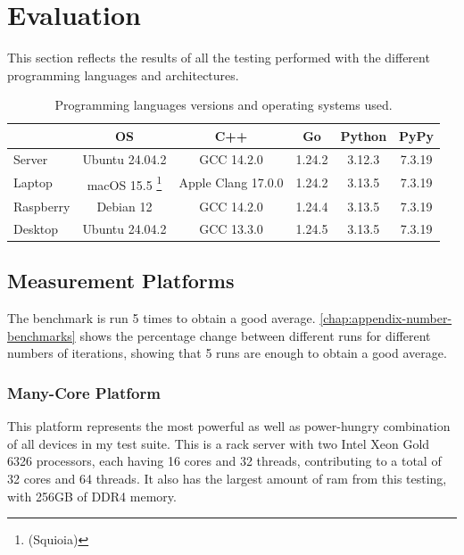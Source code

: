 \chapter{Evaluation}\label{chap:evaluation}

This section reflects the results of all the testing performed with the different programming languages and architectures.

\begin{table}[ht]
  \centering
  \begin{tabular}{lccccc}
    \toprule
               & \gls{OS}                         & C++                  & Go       & Python & PyPy \\
    \midrule
    Server     & Ubuntu 24.04.2                   &  GCC 14.2.0          & 1.24.2  & 3.12.3 & 7.3.19 \\
    Laptop     & macOS 15.5 \footnote{(Squioia)}  &  Apple Clang 17.0.0  & 1.24.2  & 3.13.5 & 7.3.19 \\
    Raspberry  & Debian 12                        &  GCC 14.2.0          & 1.24.4  & 3.13.5 & 7.3.19 \\
    Desktop    & Ubuntu 24.04.2                   &  GCC 13.3.0          & 1.24.5  & 3.13.5 & 7.3.19 \\
    \bottomrule
  \end{tabular}
  \caption[Language versions and compilers per platform]{Programming languages versions and operating systems used.}
  \label{tab:lang-platforms}
\end{table}

\section{Measurement Platforms}

The benchmark is run 5 times to obtain a good average. \autoref{chap:appendix-number-benchmarks} shows the percentage change between different runs for different numbers of iterations, showing that 5 runs are enough to obtain a good average.

\subsection{Many-Core Platform}

This platform represents the most powerful as well as power-hungry combination of all devices in my test suite. This is a rack server with two Intel Xeon Gold 6326 processors, each having 16 cores and 32 threads, contributing to a total of 32 cores and 64 threads. It also has the largest amount of \gls{ram} from this testing, with 256GB of \gls{DDR4} memory.

